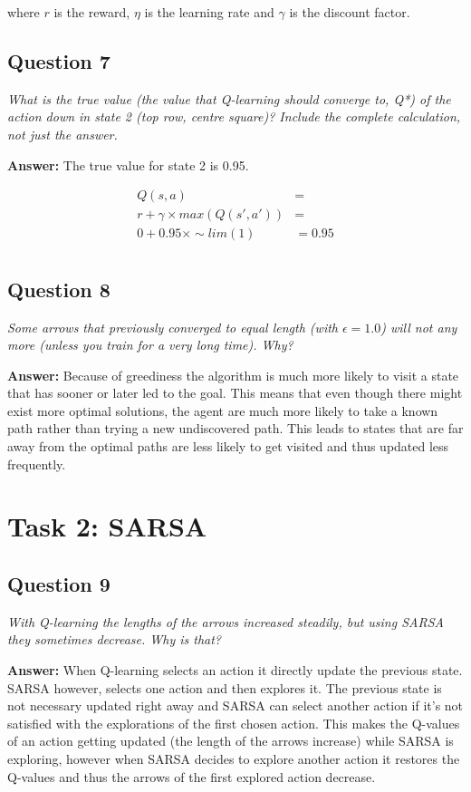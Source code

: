 \documentclass[a4paper]{article}
\begin{document}
 where $r$ is the reward, $\eta$ is the learning rate and $\gamma$ is the discount factor.

\subsection*{Question 7}
\emph{What is the true value (the value that Q-learning should converge
to, Q*) of the action down in state 2 (top row, centre square)? Include the complete calculation, not just the answer.}

\textbf{Answer:} The true value for state 2 is 0.95.

\begin{align*}
Q(s, a)                    &= \\
r + \gamma \times max(Q(s', a'))   &= \\
0 + 0.95 \times \sim lim(1) &= 0.95 \\
\end{align*}

\subsection*{Question 8}
\emph{Some arrows that previously converged to equal length (with $\epsilon = 1.0$) will not any more (unless you train for a very long time). Why?}

\textbf{Answer:} Because of greediness the algorithm is much more likely to visit a state that has sooner or later led to the goal. This means that even though there might exist more optimal solutions, the agent are much more likely to take a known path rather than trying a new undiscovered path. 
This leads to states that are far away from the optimal paths are less likely to get visited and thus updated less frequently.

\section{Task 2: SARSA}

\subsection*{Question 9}
\emph{With Q-learning the lengths of the arrows increased steadily, but
using SARSA they sometimes decrease. Why is that?}

\textbf{Answer:} When Q-learning selects an action it directly update the previous state. SARSA however, selects one action and then explores it. The previous state is not necessary updated right away and SARSA can select another action if it's not satisfied with the explorations of the first chosen action. This makes the Q-values of an action getting updated (the length of the arrows increase) while SARSA is exploring, however when SARSA decides to explore another action it restores the Q-values and thus the arrows of the first explored action decrease.
\end{document}
